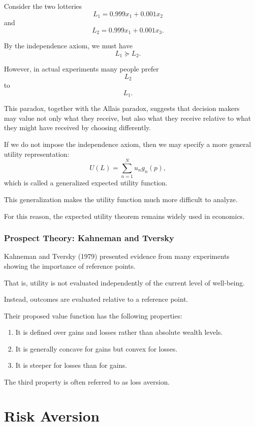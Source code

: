 Consider the two lotteries
\[
L_1
=
0.999x_1+0.001x_2
\]
and
\[
L_2
=
0.999x_1+0.001x_3.
\]

By the independence axiom, we must have
\[
L_1\succeq L_2.
\]

However, in actual experiments many people prefer
\[
L_2
\]
to
\[
L_1.
\]

This paradox, together with the Allais paradox, suggests that decision makers may value not only what they receive, but also what they receive relative to what they might have received by choosing differently.

If we do not impose the independence axiom, then we may specify a more general utility representation:
\[
U(L)
=
\sum_{n=1}^N u_n g_n(p),
\]
which is called a generalized expected utility function.

This generalization makes the utility function much more difficult to analyze.

For this reason, the expected utility theorem remains widely used in economics.

\subsubsection{Prospect Theory: Kahneman and Tversky}

Kahneman and Tversky (1979) presented evidence from many experiments showing the importance of reference points.

That is, utility is not evaluated independently of the current level of well-being.

Instead, outcomes are evaluated relative to a reference point.

Their proposed value function has the following properties:

\begin{enumerate}
    \item It is defined over gains and losses rather than absolute wealth levels.
    
    \item It is generally concave for gains but convex for losses.
    
    \item It is steeper for losses than for gains.
\end{enumerate}

The third property is often referred to as loss aversion.

\section{Risk Aversion}

